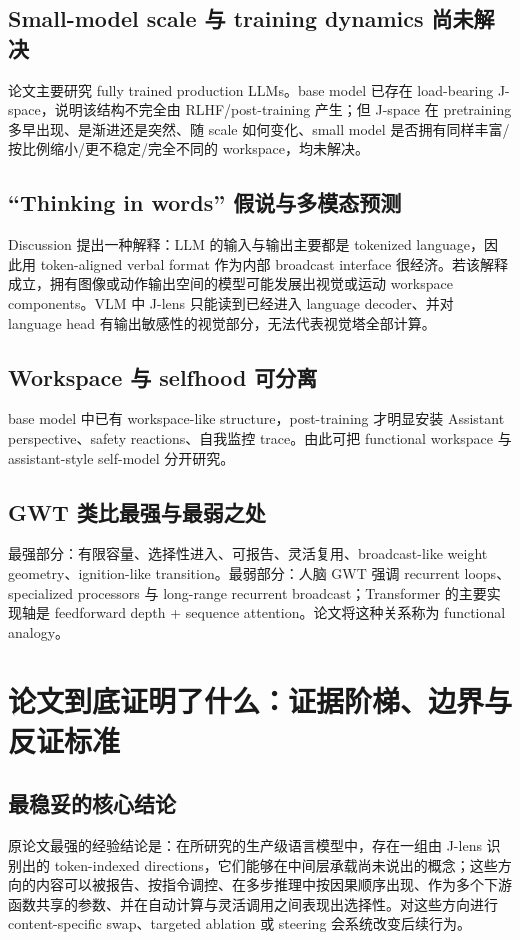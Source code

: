 \documentclass[10.5pt,a4paper]{ctexart}
\begin{document}
\subsection{Small-model scale 与 training dynamics 尚未解决}
论文主要研究 fully trained production LLMs。base model 已存在 load-bearing J-space，说明该结构不完全由 RLHF/post-training 产生；但 J-space 在 pretraining 多早出现、是渐进还是突然、随 scale 如何变化、small model 是否拥有同样丰富/按比例缩小/更不稳定/完全不同的 workspace，均未解决。

\subsection{“Thinking in words” 假说与多模态预测}
Discussion 提出一种解释：LLM 的输入与输出主要都是 tokenized language，因此用 token-aligned verbal format 作为内部 broadcast interface 很经济。若该解释成立，拥有图像或动作输出空间的模型可能发展出视觉或运动 workspace components。VLM 中 J-lens 只能读到已经进入 language decoder、并对 language head 有输出敏感性的视觉部分，无法代表视觉塔全部计算。

\subsection{Workspace 与 selfhood 可分离}
base model 中已有 workspace-like structure，post-training 才明显安装 Assistant perspective、safety reactions、自我监控 trace。由此可把 functional workspace 与 assistant-style self-model 分开研究。

\subsection{GWT 类比最强与最弱之处}
最强部分：有限容量、选择性进入、可报告、灵活复用、broadcast-like weight geometry、ignition-like transition。最弱部分：人脑 GWT 强调 recurrent loops、specialized processors 与 long-range recurrent broadcast；Transformer 的主要实现轴是 feedforward depth + sequence attention。论文将这种关系称为 functional analogy。


\section{论文到底证明了什么：证据阶梯、边界与反证标准}

\subsection{最稳妥的核心结论}
\begin{paperclaim}
原论文最强的经验结论是：在所研究的生产级语言模型中，存在一组由 J-lens 识别出的 token-indexed directions，它们能够在中间层承载尚未说出的概念；这些方向的内容可以被报告、按指令调控、在多步推理中按因果顺序出现、作为多个下游函数共享的参数、并在自动计算与灵活调用之间表现出选择性。对这些方向进行 content-specific swap、targeted ablation 或 steering 会系统改变后续行为。
\end{paperclaim}
\end{document}
